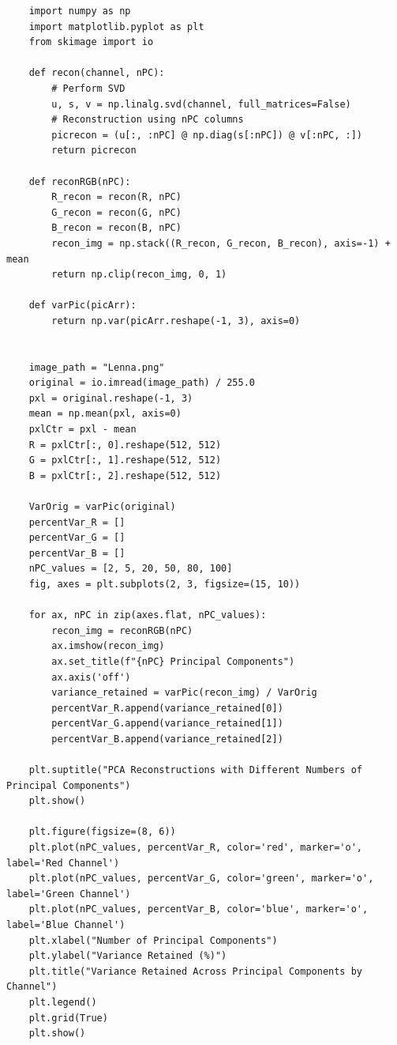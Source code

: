 \documentclass[11pt]{article}
\begin{document}
\begin{verbatim}
	import numpy as np
	import matplotlib.pyplot as plt
	from skimage import io

	def recon(channel, nPC):
		# Perform SVD
		u, s, v = np.linalg.svd(channel, full_matrices=False)
		# Reconstruction using nPC columns
		picrecon = (u[:, :nPC] @ np.diag(s[:nPC]) @ v[:nPC, :])
		return picrecon

	def reconRGB(nPC):
		R_recon = recon(R, nPC)
		G_recon = recon(G, nPC)
		B_recon = recon(B, nPC)
		recon_img = np.stack((R_recon, G_recon, B_recon), axis=-1) + mean
		return np.clip(recon_img, 0, 1)

	def varPic(picArr):
		return np.var(picArr.reshape(-1, 3), axis=0)


	image_path = "Lenna.png"
	original = io.imread(image_path) / 255.0 
	pxl = original.reshape(-1, 3)
	mean = np.mean(pxl, axis=0)
	pxlCtr = pxl - mean
	R = pxlCtr[:, 0].reshape(512, 512)
	G = pxlCtr[:, 1].reshape(512, 512)
	B = pxlCtr[:, 2].reshape(512, 512)

	VarOrig = varPic(original)
	percentVar_R = []
	percentVar_G = []
	percentVar_B = []
	nPC_values = [2, 5, 20, 50, 80, 100]
	fig, axes = plt.subplots(2, 3, figsize=(15, 10))

	for ax, nPC in zip(axes.flat, nPC_values):
		recon_img = reconRGB(nPC)
		ax.imshow(recon_img)
		ax.set_title(f"{nPC} Principal Components")
		ax.axis('off')
		variance_retained = varPic(recon_img) / VarOrig
		percentVar_R.append(variance_retained[0])
		percentVar_G.append(variance_retained[1])
		percentVar_B.append(variance_retained[2])

	plt.suptitle("PCA Reconstructions with Different Numbers of Principal Components")
	plt.show()

	plt.figure(figsize=(8, 6))
	plt.plot(nPC_values, percentVar_R, color='red', marker='o', label='Red Channel')
	plt.plot(nPC_values, percentVar_G, color='green', marker='o', label='Green Channel')
	plt.plot(nPC_values, percentVar_B, color='blue', marker='o', label='Blue Channel')
	plt.xlabel("Number of Principal Components")
	plt.ylabel("Variance Retained (%)")
	plt.title("Variance Retained Across Principal Components by Channel")
	plt.legend()
	plt.grid(True)
	plt.show()
\end{verbatim}

	
		\newpage
\end{document}
